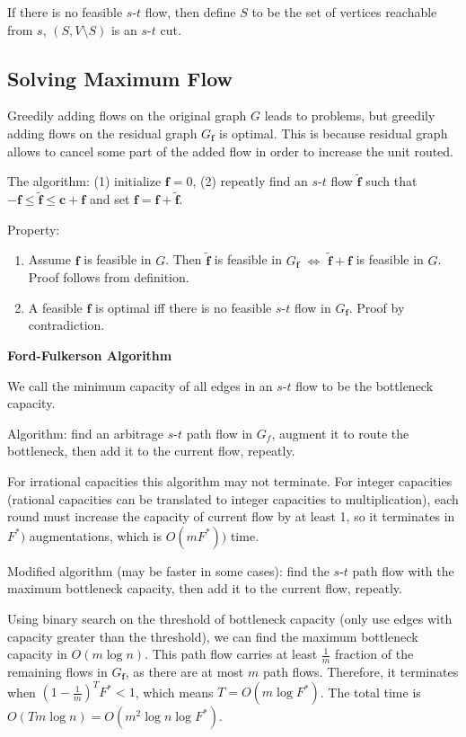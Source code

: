 If there is no feasible $s$-$t$ flow, then define $S$ to be the set of vertices reachable from $s$, $(S, V\setminus S)$ is an $s$-$t$ cut.

\subsection{Solving Maximum Flow}

Greedily adding flows on the original graph $G$ leads to problems, but greedily adding flows on the residual graph $G_{\boldsymbol{f}}$ is optimal. This is because residual graph allows to cancel some part of the added flow in order to increase the unit routed.

The algorithm: (1) initialize $\boldsymbol{f}=0$, (2) repeatly find an $s$-$t$ flow $\tilde{\boldsymbol{f}}$ such that $-\boldsymbol{f} \le \tilde{\boldsymbol{f}} \le \boldsymbol{c} + \boldsymbol{f}$ and set $\boldsymbol{f} = \boldsymbol{f} + \tilde{\boldsymbol{f}}$.

Property:
\begin{enumerate}
    \item Assume $\boldsymbol{f}$ is feasible in $G$. Then $\tilde{\boldsymbol{f}}$ is feasible in $G_{\boldsymbol{f}}$ $\Leftrightarrow$ $\tilde{\boldsymbol{f}} + \boldsymbol{f}$ is feasible in $G$. Proof follows from definition.
    \item A feasible $\boldsymbol{f}$ is optimal iff there is no feasible $s$-$t$ flow in $G_{\boldsymbol{f}}$. Proof by contradiction.
\end{enumerate}

\textbf{Ford-Fulkerson Algorithm}

We call the minimum capacity of all edges in an $s$-$t$ flow to be the bottleneck capacity.

Algorithm: find an arbitrage $s$-$t$ path flow in $G_f$, augment it to route the bottleneck, then add it to the current flow, repeatly. 

For irrational capacities this algorithm may not terminate. For integer capacities (rational capacities can be translated to integer capacities to multiplication), each round must increase the capacity of current flow by at least 1, so it terminates in $F^*)$ augmentations, which is $O(m F^*))$ time.

Modified algorithm (may be faster in some cases): find the $s$-$t$ path flow with the maximum bottleneck capacity, then add it to the current flow, repeatly.

Using binary search on the threshold of bottleneck capacity (only use edges with capacity greater than the threshold), we can find the maximum bottleneck capacity in $O(m \log n)$. This path flow carries at least $\frac{1}{m}$ fraction of the remaining flows in $G_{\boldsymbol{f}}$, as there are at most $m$ path flows. Therefore, it terminates when $(1-\frac{1}{m})^T F^* < 1$, which means $T = O(m \log F^*)$. The total time is $O(T m \log n) = O(m^2 \log n \log F^*)$.

